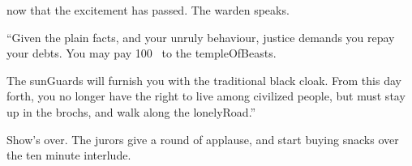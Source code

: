 now that the excitement has passed.
The \gls{warden} speaks.

\begin{speechtext}
  ``Given the plain facts, and your unruly behaviour, justice demands you repay your debts.
  You may pay 100~ to the \gls{templeOfBeasts}.

  The \glspl{sunGuard} will furnish you with the traditional black cloak.
  From this day forth, you no longer have the right to live among civilized people, but must stay up in the \glspl{broch}, and walk along the \gls{lonelyRoad}.''
\end{speechtext}

Show's over.
The jurors give a round of applause, and start buying snacks over the ten minute interlude.

